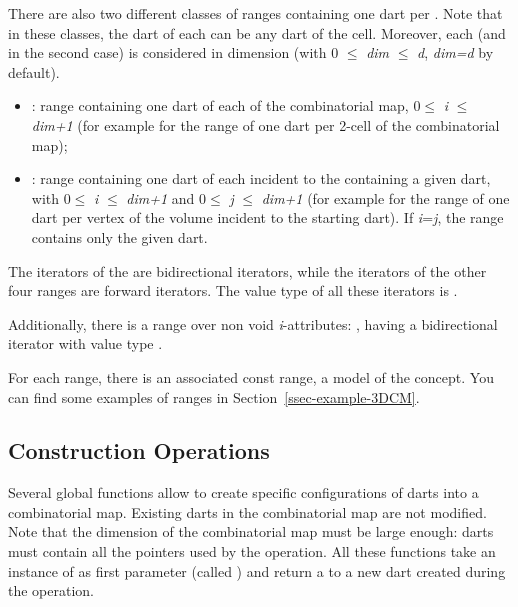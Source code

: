 There are also two different classes of ranges containing one dart per
. Note that in these classes, the dart of each  can
be any dart of the cell. Moreover, each  (and  in the
second case) is considered in dimension  (with 0 $\leq$ \emph{dim}
$\leq$ \emph{d}, \emph{dim=d} by default).
\begin{itemize}
\item {}: range containing one dart of
  each  of the combinatorial map, 0$\leq$ \emph{i} $\leq$ \emph{dim+1} (for
  example  for the range of one dart per
  2-cell of the combinatorial map);
\item {}: range
  containing one dart of each  incident to the 
  containing a given dart, with 0$\leq$ \emph{i} $\leq$ \emph{dim+1} and 0$\leq$ \emph{j}
  $\leq$ \emph{dim+1} (for example
   for the range of
  one dart per vertex of the volume incident to the starting dart).
  If \emph{i}=\emph{j}, the range contains only the given dart.
\end{itemize}

The iterators of the  are bidirectional iterators, 
while the iterators of the other four ranges are forward iterators. 
The value type of all these iterators is .

Additionally, there is a range over non void \emph{i}-attributes:
, having a bidirectional iterator with
value type .

For each range, there is an associated const range, a model of the
 concept.  You can find some examples of ranges in
Section~\ref{ssec-example-3DCM}.

\subsection{Construction Operations}\label{ssec-construction}

Several global functions allow to create specific configurations of
darts into a combinatorial map. Existing darts in the combinatorial
map are not modified. Note that the dimension of the combinatorial map
must be large enough: darts must contain all the \betats{} pointers used by the
operation. All these functions take an instance of
 as first parameter (called ) and return
a  to a new dart created during the operation.

